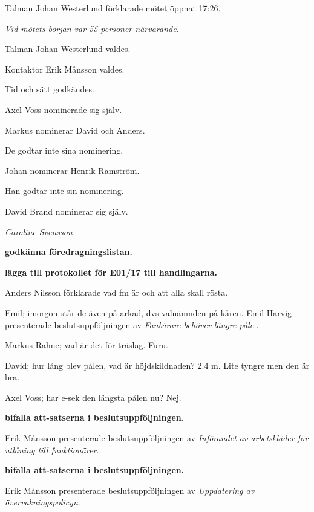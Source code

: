 \documentclass[10pt]{article}
\def\mo{Johan Westerlund}
\def\ms{Erik Månsson}
\begin{document}
\begin{paragrafer}
Talman {\mo} förklarade mötet öppnat 17:26.

\emph{Vid mötets början var 55 personer närvarande.}

Talman {\mo} valdes.

Kontaktor {\ms} valdes.

Tid och sätt godkändes.

Axel Voss nominerade sig själv.

Markus nominerar David och Anders.

De godtar inte sina nominering.

Johan nominerar Henrik Ramström.

Han godtar inte sin nominering.

David Brand nominerar sig själv.

\valavj
{}
\emph{Caroline Svensson}


\textbf{\Mba godkänna föredragningslistan.}

\textbf{\Mba lägga till protokollet för E01/17 till handlingarna.}

Anders Nilsson förklarade vad fm är och att alla skall rösta.

Emil; imorgon står de även på arkad, dvs valnämnden på kåren.
Emil Harvig presenterade beslutsuppföljningen av \emph{Fanbärare behöver längre påle.}.

Markus Rahne; vad är det för träslag. Furu.

David; hur lång blev pålen, vad är höjdskildnaden? 2.4 m. Lite tyngre men den är bra.

Axel Voss; har e-sek den längsta pålen nu? Nej.

\textbf{\Mba bifalla att-satserna i beslutsuppföljningen.}

Erik Månsson presenterade beslutsuppföljningen av \emph{Införandet av arbetskläder för utlåning till funktionärer}.

\textbf{\Mba bifalla att-satserna i beslutsuppföljningen.}

Erik Månsson presenterade beslutsuppföljningen av \emph{Uppdatering av övervakningspolicyn}.


\end{paragrafer}
\end{document}
